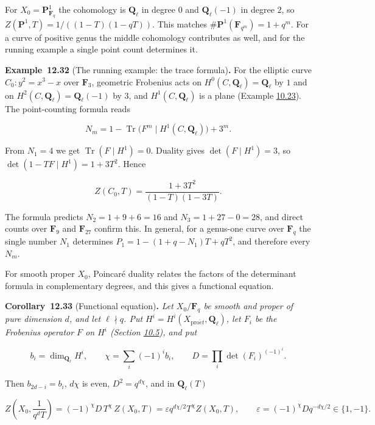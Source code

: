 \documentclass[11pt]{article}
\newenvironment{bpstatement}[2]{\par\addvspace{0.6\baselineskip}\noindent\textbf{#1}#2\textbf{.}\enspace\ignorespaces}
  {\par\addvspace{0.4\baselineskip}}
\newenvironment{bpstatementit}[2]{\begin{bpstatement}{#1}{#2}\itshape\ignorespaces}{\end{bpstatement}}
\begin{document}
For \(X_0=\mathbf P^1_{\mathbf F_q}\) the cohomology is \(\mathbf Q_\ell\) in degree \(0\) and \(\mathbf Q_\ell(-1)\) in degree \(2\), so \(Z(\mathbf P^1,T)=1/((1-T)(1-qT))\). This matches \(\#\mathbf P^1(\mathbf F_{q^m})=1+q^m\). For a curve of positive genus the middle cohomology contributes as well, and for the running example a single point count determines it.

\label{bp323}%
\begin{bpstatement}{Example~12.32}{ (The running example: the trace formula)}
For the elliptic curve \(C_0\colon y^2=x^3-x\) over \(\mathbf F_3\), geometric Frobenius acts on \(H^0(C,\mathbf Q_\ell)=\mathbf Q_\ell\) by \(1\) and on \(H^2(C,\mathbf Q_\ell)=\mathbf Q_\ell(-1)\) by \(3\), and \(H^1(C,\mathbf Q_\ell)\) is a plane (Example \hyperref[bp169]{10.23}). The point-counting formula reads

\[
N_m=1-\operatorname{Tr}\bigl(F^m\mid H^1(C,\mathbf Q_\ell)\bigr)+3^m .
\]

From \(N_1=4\) we get \(\operatorname{Tr}(F\mid H^1)=0\). Duality gives \(\det(F\mid H^1)=3\), so \(\det(1-TF\mid H^1)=1+3T^2\). Hence

\[
Z(C_0,T)=\frac{1+3T^2}{(1-T)(1-3T)}.
\]

The formula predicts \(N_2=1+9+6=16\) and \(N_3=1+27-0=28\), and direct counts over \(\mathbf F_9\) and \(\mathbf F_{27}\) confirm this. In general, for a genus-one curve over \(\mathbf F_q\) the single number \(N_1\) determines \(P_1=1-(1+q-N_1)T+qT^2\), and therefore every \(N_m\).
\end{bpstatement}

\label{bp324}%
For smooth proper \(X_0\), Poincaré duality relates the factors of the determinant formula in complementary degrees, and this gives a functional equation.

\label{bp325}%
\begin{bpstatementit}{Corollary~12.33}{ (Functional equation)}
Let \(X_0/\mathbf F_q\) be smooth and proper of pure dimension \(d\), and let \(\ell\nmid q\). Put \(H^i=H^i(X_{\mathrm{pro}\acute{e}t},\mathbf Q_\ell)\), let \(F_i\) be the Frobenius operator \(F\) on \(H^i\) (Section \hyperref[bp154]{10.5}), and put

\[
b_i=\dim_{\mathbf Q_\ell}H^i,\qquad \chi=\sum_i(-1)^ib_i,\qquad
D=\prod_i\det(F_i)^{(-1)^i}.
\]

Then \(b_{2d-i}=b_i\), \(d\chi\) is even, \(D^2=q^{d\chi}\), and in \(\mathbf Q_\ell(T)\)

\[
Z\!\left(X_0,\frac1{q^dT}\right)=(-1)^{\chi}D\,T^{\chi}\,Z(X_0,T)
=\varepsilon q^{d\chi/2}T^{\chi}Z(X_0,T),
\qquad \varepsilon=(-1)^\chi Dq^{-d\chi/2}\in\{1,-1\}.
\]
\end{bpstatementit}
\end{document}
